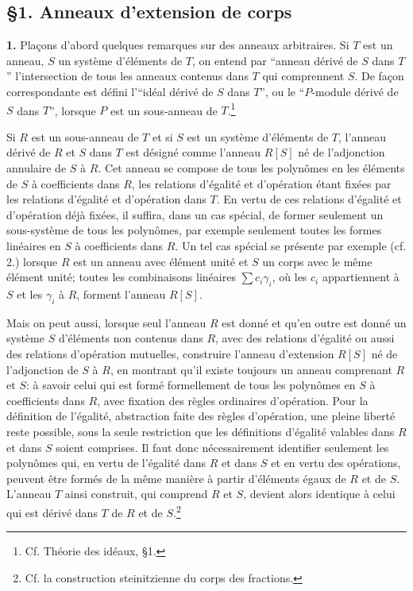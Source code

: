 \subsection*{\S 1. Anneaux d'extension de corps}

\textbf{1.} Plaçons d'abord quelques remarques sur des anneaux arbitraires. Si $T$ est un anneau, $S$ un système d'éléments de $T$, on entend par ``anneau dérivé de $S$ dans $T$'' l'intersection de tous les anneaux contenus dans $T$ qui comprennent $S$. De façon correspondante est défini l'``idéal dérivé de $S$ dans $T$'', ou le ``$P$-module dérivé de $S$ dans $T$'', lorsque $P$ est un sous-anneau de $T$.\footnote{Cf. Théorie des idéaux, \S 1.}

Si $R$ est un sous-anneau de $T$ et si $S$ est un système d'éléments de $T$, l'anneau dérivé de $R$ et $S$ dans $T$ est désigné comme l'anneau $R[S]$ né de l'adjonction annulaire de $S$ à $R$. Cet anneau se compose de tous les polynômes en les éléments de $S$ à coefficients dans $R$, les relations d'égalité et d'opération étant fixées par les relations d'égalité et d'opération dans $T$. En vertu de ces relations d'égalité et d'opération déjà fixées, il suffira, dans un cas spécial, de former seulement un sous-système de tous les polynômes, par exemple seulement toutes les formes linéaires en $S$ à coefficients dans $R$. Un tel cas spécial se présente par exemple (cf. 2.) lorsque $R$ est un anneau avec élément unité et $S$ un corps avec le même élément unité; toutes les combinaisons linéaires $\sum c_i\gamma_i$, où les $c_i$ appartiennent à $S$ et les $\gamma_i$ à $R$, forment l'anneau $R[S]$.

Mais on peut aussi, lorsque seul l'anneau $R$ est donné et qu'en outre est donné un système $S$ d'éléments non contenus dans $R$, avec des relations d'égalité ou aussi des relations d'opération mutuelles, construire l'anneau d'extension $R[S]$ né de l'adjonction de $S$ à $R$, en montrant qu'il existe toujours un anneau comprenant $R$ et $S$: à savoir celui qui est formé formellement de tous les polynômes en $S$ à coefficients dans $R$, avec fixation des règles ordinaires d'opération. Pour la définition de l'égalité, abstraction faite des règles d'opération, une pleine liberté reste possible, sous la seule restriction que les définitions d'égalité valables dans $R$ et dans $S$ soient comprises. Il faut donc nécessairement identifier seulement les polynômes qui, en vertu de l'égalité dans $R$ et dans $S$ et en vertu des opérations, peuvent être formés de la même manière à partir d'éléments égaux de $R$ et de $S$. L'anneau $T$ ainsi construit, qui comprend $R$ et $S$, devient alors identique à celui qui est dérivé dans $T$ de $R$ et de $S$.\footnote{Cf. la construction steinitzienne du corps des fractions.}

